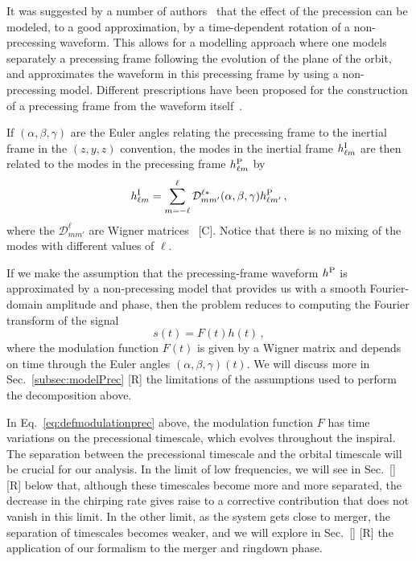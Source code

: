 \documentclass[aps,showpacs,twocolumn,
prd,superscriptaddress,nofootinbib]{revtex4-1}
\newcommand{\be}{\begin{equation}}
\newcommand{\ee}{\end{equation}}
\newcommand\calD{{\mathcal{D}}}
\newcommand{\SM}[1]{{\color{Red} #1}}
\begin{document}
It was suggested by a number of authors~\cite{BCV03b, BCPTV05, Schmidt+10, OShaughnessy+11, Boyle+11} that the effect of the precession can be modeled, to a good approximation, by a time-dependent rotation of a non-precessing waveform. This allows for a modelling approach where one models separately a precessing frame following the evolution of the plane of the orbit, and approximates the waveform in this precessing frame by using a non-precessing model. Different prescriptions have been proposed for the construction of a precessing frame from the waveform itself~\cite{Schmidt+10, OShaughnessy+11, Boyle+11}.

If $(\alpha, \beta, \gamma)$ are the Euler angles relating the precessing frame to the inertial frame in the $(z,y,z)$ convention, the modes in the inertial frame $h_{\ell m}^{\rm I}$ are then related to the modes in the precessing frame $h_{\ell m}^{\rm P}$ by~\cite{Goldberg+67}
\be\label{eq:wignerrotintro}
	h_{\ell m}^{\rm I} = \sum\limits_{m=-\ell}^{\ell} \calD^{\ell *}_{mm'} (\alpha,\beta,\gamma) h_{\ell m'}^{\rm P} \,,
\ee
where the $\calD^{\ell}_{mm'}$ are Wigner matrices~\cite{} \SM{[C]}. Notice that there is no mixing of the modes with different values of $\ell$.

If we make the assumption that the precessing-frame waveform $h^{\rm P}$ is approximated by a non-precessing model that provides us with a smooth Fourier-domain amplitude and phase, then the problem reduces to computing the Fourier transform of the signal
\be\label{eq:defmodulationprec}
	s(t) = F(t) h(t) \,,
\ee
where the modulation function $F(t)$ is given by a Wigner matrix and depends on time through the Euler angles $(\alpha, \beta, \gamma)(t)$. We will discuss more in Sec.~\ref{subsec:modelPrec} \SM{[R]} the limitations of the assumptions used to perform the decomposition above.

In Eq.~\eqref{eq:defmodulationprec} above, the modulation function $F$ has time variations on the precessional timescale, which evolves throughout the inspiral. The separation between the precessional timescale and the orbital timescale will be crucial for our analysis. In the limit of low frequencies, we will see in Sec.~\ref{} \SM{[R]} below that, although these timescales become more and more separated, the decrease in the chirping rate gives raise to a corrective contribution that does not vanish in this limit. In the other limit, as the system gets close to merger, the separation of timescales becomes weaker, and we will explore in Sec.~\ref{} \SM{[R]} the application of our formalism to the merger and ringdown phase.
\end{document}
